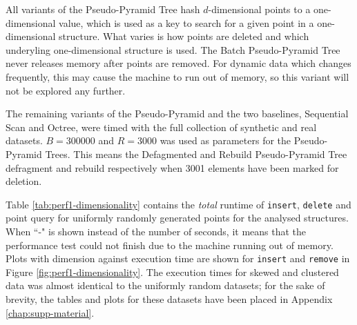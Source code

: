 All variants of the Pseudo-Pyramid Tree hash $d$-dimensional points to a one-dimensional value, which is used as a key to search for a given point in a one-dimensional structure. What varies is how points are deleted and which underyling one-dimensional structure is used. The Batch Pseudo-Pyramid Tree never releases memory after points are removed. For dynamic data which changes frequently, this may cause the machine to run out of memory, so this variant will not be explored any further.

The remaining variants of the Pseudo-Pyramid and the two baselines, Sequential Scan and Octree, were timed with the full collection of synthetic and real datasets. $B = 300000$ and $R=3000$ was used as parameters for the Pseudo-Pyramid Trees. This means the Defagmented and Rebuild Pseudo-Pyramid Tree defragment and rebuild respectively when 3001 elements have been marked for deletion.

Table \ref{tab:perf1-dimensionality} contains the \textit{total} runtime of \texttt{insert}, \texttt{delete} and point query for uniformly randomly generated points for the analysed structures. When ``-" is shown instead of the number of seconds, it means that the performance test could not finish due to the machine running out of memory. Plots with dimension against execution time are shown for \texttt{insert} and \texttt{remove} in Figure \ref{fig:perf1-dimensionality}. The execution times for skewed and clustered data was almost identical to the uniformly random datasets; for the sake of brevity, the tables and plots for these datasets have been placed in Appendix \ref{chap:supp-material}.

